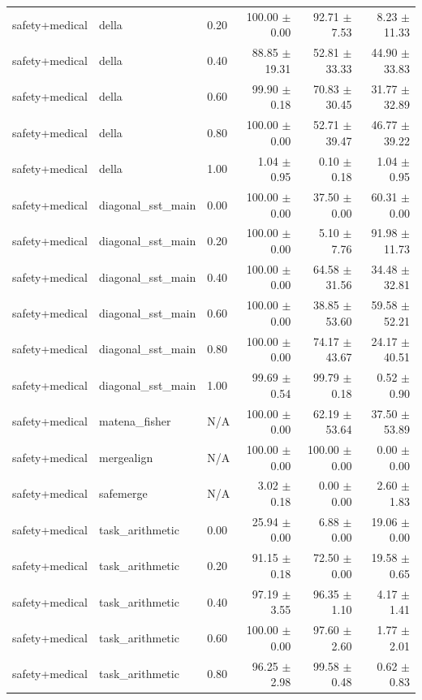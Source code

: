 \begin{table}[H]
{\begin{tabular}{lllrrr}
safety+medical & della & 0.20 & 100.00 $\pm$ 0.00 & 92.71 $\pm$ 7.53 & 8.23 $\pm$ 11.33 \\
safety+medical & della & 0.40 & 88.85 $\pm$ 19.31 & 52.81 $\pm$ 33.33 & 44.90 $\pm$ 33.83 \\
safety+medical & della & 0.60 & 99.90 $\pm$ 0.18 & 70.83 $\pm$ 30.45 & 31.77 $\pm$ 32.89 \\
safety+medical & della & 0.80 & 100.00 $\pm$ 0.00 & 52.71 $\pm$ 39.47 & 46.77 $\pm$ 39.22 \\
safety+medical & della & 1.00 & 1.04 $\pm$ 0.95 & 0.10 $\pm$ 0.18 & 1.04 $\pm$ 0.95 \\
safety+medical & diagonal\_sst\_main & 0.00 & 100.00 $\pm$ 0.00 & 37.50 $\pm$ 0.00 & 60.31 $\pm$ 0.00 \\
safety+medical & diagonal\_sst\_main & 0.20 & 100.00 $\pm$ 0.00 & 5.10 $\pm$ 7.76 & 91.98 $\pm$ 11.73 \\
safety+medical & diagonal\_sst\_main & 0.40 & 100.00 $\pm$ 0.00 & 64.58 $\pm$ 31.56 & 34.48 $\pm$ 32.81 \\
safety+medical & diagonal\_sst\_main & 0.60 & 100.00 $\pm$ 0.00 & 38.85 $\pm$ 53.60 & 59.58 $\pm$ 52.21 \\
safety+medical & diagonal\_sst\_main & 0.80 & 100.00 $\pm$ 0.00 & 74.17 $\pm$ 43.67 & 24.17 $\pm$ 40.51 \\
safety+medical & diagonal\_sst\_main & 1.00 & 99.69 $\pm$ 0.54 & 99.79 $\pm$ 0.18 & 0.52 $\pm$ 0.90 \\
safety+medical & matena\_fisher & N/A & 100.00 $\pm$ 0.00 & 62.19 $\pm$ 53.64 & 37.50 $\pm$ 53.89 \\
safety+medical & mergealign & N/A & 100.00 $\pm$ 0.00 & 100.00 $\pm$ 0.00 & 0.00 $\pm$ 0.00 \\
safety+medical & safemerge & N/A & 3.02 $\pm$ 0.18 & 0.00 $\pm$ 0.00 & 2.60 $\pm$ 1.83 \\
safety+medical & task\_arithmetic & 0.00 & 25.94 $\pm$ 0.00 & 6.88 $\pm$ 0.00 & 19.06 $\pm$ 0.00 \\
safety+medical & task\_arithmetic & 0.20 & 91.15 $\pm$ 0.18 & 72.50 $\pm$ 0.00 & 19.58 $\pm$ 0.65 \\
safety+medical & task\_arithmetic & 0.40 & 97.19 $\pm$ 3.55 & 96.35 $\pm$ 1.10 & 4.17 $\pm$ 1.41 \\
safety+medical & task\_arithmetic & 0.60 & 100.00 $\pm$ 0.00 & 97.60 $\pm$ 2.60 & 1.77 $\pm$ 2.01 \\
safety+medical & task\_arithmetic & 0.80 & 96.25 $\pm$ 2.98 & 99.58 $\pm$ 0.48 & 0.62 $\pm$ 0.83 \\

\end{tabular}}
\end{table}
